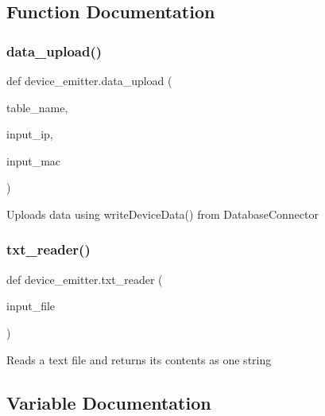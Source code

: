 \subsection{Function Documentation}
\mbox{\label{namespacedevice__emitter_a3d36fb9ab99c12fae8dff6cae0b9c309}} 
\subsubsection{\texorpdfstring{data\+\_\+upload()}{data\_upload()}}
{\footnotesize\ttfamily def device\+\_\+emitter.\+data\+\_\+upload (\begin{DoxyParamCaption}\item[{}]{table\+\_\+name,  }\item[{}]{input\+\_\+ip,  }\item[{}]{input\+\_\+mac }\end{DoxyParamCaption})}

\begin{DoxyVerb}Uploads data using writeDeviceData() from DatabaseConnector\end{DoxyVerb}
 \mbox{\label{namespacedevice__emitter_a37babfaa6ea3bbb358c94516521f9442}} 
\subsubsection{\texorpdfstring{txt\+\_\+reader()}{txt\_reader()}}
{\footnotesize\ttfamily def device\+\_\+emitter.\+txt\+\_\+reader (\begin{DoxyParamCaption}\item[{}]{input\+\_\+file }\end{DoxyParamCaption})}

\begin{DoxyVerb}Reads a text file and returns its contents as one string\end{DoxyVerb}
 

\subsection{Variable Documentation}
\mbox{\label{namespacedevice__emitter_ae3817f26c179f6e6e62775fcabaa1bc9}} 
